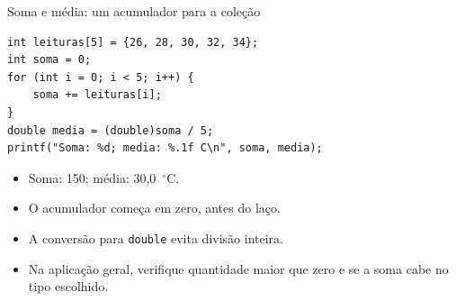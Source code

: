 \begin{frame}[fragile]{Soma e média: um acumulador para a coleção}
\begin{lstlisting}
int leituras[5] = {26, 28, 30, 32, 34};
int soma = 0;
for (int i = 0; i < 5; i++) {
    soma += leituras[i];
}
double media = (double)soma / 5;
printf("Soma: %d; media: %.1f C\n", soma, media);
\end{lstlisting}
\begin{itemize}
\item Soma: 150; média: 30,0~$^\circ$C.
\item O acumulador começa em zero, antes do laço.
\item A conversão para \texttt{double} evita divisão inteira.
\item Na aplicação geral, verifique quantidade maior que zero e se a soma cabe no tipo escolhido.
\end{itemize}
\end{frame}

